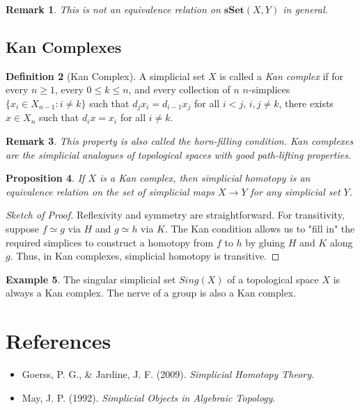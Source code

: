 \documentclass[11pt]{article}
\theoremstyle{definition}
\newtheorem{definition}{Definition}[section]
\newtheorem{example}[definition]{Example}
\theoremstyle{plain}
\newtheorem{proposition}[definition]{Proposition}
\newtheorem{remark}[definition]{Remark}
\begin{document}
\begin{remark}
    This is not an equivalence relation on $\mathbf{sSet}(X,Y)$ in general.
\end{remark}









\subsection{Kan Complexes}

\begin{definition}[Kan Complex]
    A simplicial set $X$ is called a \emph{Kan complex} if for every $n \geq 1$, every $0 \leq k \leq n$, and every collection of $n$ $n$-simplices $\{x_i \in X_{n-1} : i \neq k\}$ such that $d_j x_i = d_{i-1} x_j$ for all $i < j$, $i, j \neq k$, there exists $x \in X_n$ such that $d_i x = x_i$ for all $i \neq k$.
\end{definition}

\begin{remark}
    This property is also called the \emph{horn-filling condition}. Kan complexes are the simplicial analogues of topological spaces with good path-lifting properties.
\end{remark}

\begin{proposition}
    If $X$ is a Kan complex, then simplicial homotopy is an equivalence relation on the set of simplicial maps $X \to Y$ for any simplicial set $Y$.
\end{proposition}

\begin{proof}[Sketch of Proof]
    Reflexivity and symmetry are straightforward. For transitivity, suppose $f \simeq g$ via $H$ and $g \simeq h$ via $K$. The Kan condition allows us to "fill in" the required simplices to construct a homotopy from $f$ to $h$ by gluing $H$ and $K$ along $g$. Thus, in Kan complexes, simplicial homotopy is transitive.
\end{proof}

\begin{example}
    The singular simplicial set $Sing(X)$ of a topological space $X$ is always a Kan complex. The nerve of a group is also a Kan complex.
\end{example}







\section{References}
\begin{itemize}
    \item Goerss, P. G., \& Jardine, J. F. (2009). \emph{Simplicial Homotopy Theory}.
    \item May, J. P. (1992). \emph{Simplicial Objects in Algebraic Topology}.
\end{itemize}
\end{document}
